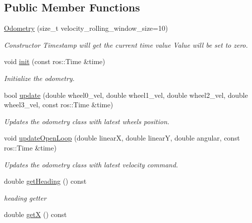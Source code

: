 \subsection*{Public Member Functions}
\begin{DoxyCompactItemize}
\item 
\hyperlink{classmecanum__drive__controller_1_1Odometry_a1ee869a418151783f8283e0911073c94}{Odometry} (size\+\_\+t velocity\+\_\+rolling\+\_\+window\+\_\+size=10)
\begin{DoxyCompactList}\small\item\em Constructor Timestamp will get the current time value Value will be set to zero. \end{DoxyCompactList}\item 
void \hyperlink{classmecanum__drive__controller_1_1Odometry_aab16ac85e777de56f586734fad0d3b54}{init} (const ros\+::\+Time \&time)
\begin{DoxyCompactList}\small\item\em Initialize the odometry. \end{DoxyCompactList}\item 
bool \hyperlink{classmecanum__drive__controller_1_1Odometry_af4c7c019ccb5db9878bbdf0b83bbbc5c}{update} (double wheel0\+\_\+vel, double wheel1\+\_\+vel, double wheel2\+\_\+vel, double wheel3\+\_\+vel, const ros\+::\+Time \&time)
\begin{DoxyCompactList}\small\item\em Updates the odometry class with latest wheels position. \end{DoxyCompactList}\item 
void \hyperlink{classmecanum__drive__controller_1_1Odometry_ab0562b24b9174f345683e28f1bbb2e49}{update\+Open\+Loop} (double linearX, double linearY, double angular, const ros\+::\+Time \&time)
\begin{DoxyCompactList}\small\item\em Updates the odometry class with latest velocity command. \end{DoxyCompactList}\item 
double \hyperlink{classmecanum__drive__controller_1_1Odometry_ae99c465bd00eb9498266ec88fe7712f7}{get\+Heading} () const
\begin{DoxyCompactList}\small\item\em heading getter \end{DoxyCompactList}\item 
double \hyperlink{classmecanum__drive__controller_1_1Odometry_a4964c24a7e17cca8d3eba39123e92733}{getX} () const

\end{DoxyCompactItemize}
